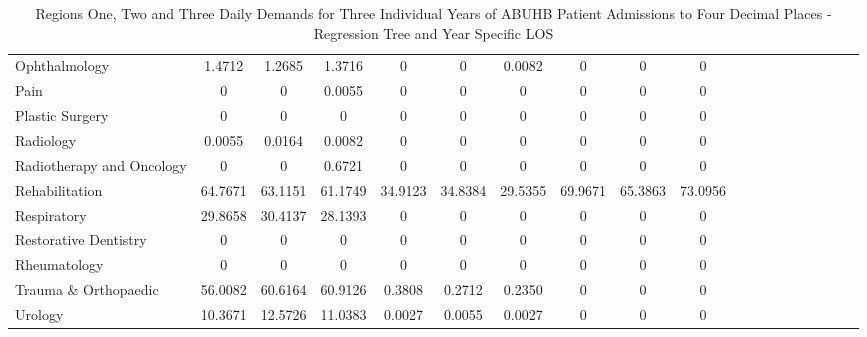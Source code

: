 \documentclass[thesis.tex]{subfiles}
\begin{document}
\begin{landscape}
\begin{table}[h!]
{\begin{tabular}{lcccccccccccccccccc}
Ophthalmology	&1.4712&	1.2685	&1.3716&	0	&0&	0.0082&0&0&	0\\
Pain&	0	&0	&0.0055&0	&0&	0&	0&	0&	0\\
Plastic Surgery&	0	&0&	0	&0&	0	&0	&0&	0&	0\\
Radiology	&0.0055&	0.0164&	0.0082&	0	&0	&0	&0&	0&	0\\
Radiotherapy and Oncology	&0	&0&	0.6721	&0	&0&	0&	0	&0	&0\\
Rehabilitation	&64.7671&	63.1151&	61.1749	&34.9123&	34.8384	&29.5355	&69.9671	&65.3863	&73.0956\\
Respiratory	&29.8658	&30.4137	&28.1393&	0	&0&	0&	0	&0&	0\\
Restorative Dentistry	&0	&0	&0	&0	&0&	0&	0&	0	&0\\
Rheumatology&	0&	0&	0	&0	&0&	0&	0&0&	0\\
Trauma \& Orthopaedic	&56.0082	&60.6164	&60.9126&	0.3808&	0.2712	&0.2350&	0	&0&	0\\
Urology&	10.3671&	12.5726	&11.0383&	0.0027	&0.0055	&0.0027	&0&	0	&0\\
\bottomrule
\end{tabular}  } 
\caption{Regions One, Two and Three Daily Demands for Three Individual Years of ABUHB Patient Admissions to Four Decimal Places - Regression Tree and Year Specific LOS}
    \label{apptab:LinkedDemands5a}
\end{table}


\end{landscape}
\end{document}
